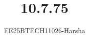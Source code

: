 \documentclass[journal]{IEEEtran}
\begin{document}

\vspace{3cm}

\title{10.7.75}
\author{EE25BTECH11026-Harsha}
 \maketitle
{\let\newpage\relax\maketitle}

\renewcommand{\thefigure}{\theenumi}
\renewcommand{\thetable}{\theenumi}
\setlength{\intextsep}{10pt} %


\renewcommand{\thetable}{\theenumi}
\end{document}
